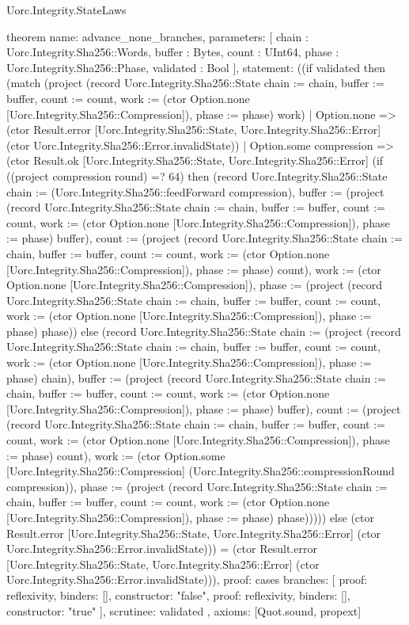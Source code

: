 \begin{lexlean}{Uorc.Integrity.StateLaws}
\begin{semanticmodule}
theorem{
  name: advance_none_branches,
  parameters: [
    chain : Uorc.Integrity.Sha256::Words,
    buffer : Bytes,
    count : UInt64,
    phase : Uorc.Integrity.Sha256::Phase,
    validated : Bool
  ],
  statement: ((if validated then (match (project (record Uorc.Integrity.Sha256::State {chain := chain, buffer := buffer, count := count, work := (ctor Option.none [Uorc.Integrity.Sha256::Compression]), phase := phase}) work)
    | Option.none => (ctor Result.error [Uorc.Integrity.Sha256::State, Uorc.Integrity.Sha256::Error] (ctor Uorc.Integrity.Sha256::Error.invalidState))
    | Option.some compression => (ctor Result.ok [Uorc.Integrity.Sha256::State, Uorc.Integrity.Sha256::Error] (if ((project compression round) =? 64) then (record Uorc.Integrity.Sha256::State {chain := (Uorc.Integrity.Sha256::feedForward compression), buffer := (project (record Uorc.Integrity.Sha256::State {chain := chain, buffer := buffer, count := count, work := (ctor Option.none [Uorc.Integrity.Sha256::Compression]), phase := phase}) buffer), count := (project (record Uorc.Integrity.Sha256::State {chain := chain, buffer := buffer, count := count, work := (ctor Option.none [Uorc.Integrity.Sha256::Compression]), phase := phase}) count), work := (ctor Option.none [Uorc.Integrity.Sha256::Compression]), phase := (project (record Uorc.Integrity.Sha256::State {chain := chain, buffer := buffer, count := count, work := (ctor Option.none [Uorc.Integrity.Sha256::Compression]), phase := phase}) phase)}) else (record Uorc.Integrity.Sha256::State {chain := (project (record Uorc.Integrity.Sha256::State {chain := chain, buffer := buffer, count := count, work := (ctor Option.none [Uorc.Integrity.Sha256::Compression]), phase := phase}) chain), buffer := (project (record Uorc.Integrity.Sha256::State {chain := chain, buffer := buffer, count := count, work := (ctor Option.none [Uorc.Integrity.Sha256::Compression]), phase := phase}) buffer), count := (project (record Uorc.Integrity.Sha256::State {chain := chain, buffer := buffer, count := count, work := (ctor Option.none [Uorc.Integrity.Sha256::Compression]), phase := phase}) count), work := (ctor Option.some [Uorc.Integrity.Sha256::Compression] (Uorc.Integrity.Sha256::compressionRound compression)), phase := (project (record Uorc.Integrity.Sha256::State {chain := chain, buffer := buffer, count := count, work := (ctor Option.none [Uorc.Integrity.Sha256::Compression]), phase := phase}) phase)})))) else (ctor Result.error [Uorc.Integrity.Sha256::State, Uorc.Integrity.Sha256::Error] (ctor Uorc.Integrity.Sha256::Error.invalidState))) = (ctor Result.error [Uorc.Integrity.Sha256::State, Uorc.Integrity.Sha256::Error] (ctor Uorc.Integrity.Sha256::Error.invalidState))),
  proof: cases{
    branches: [
      {proof: reflexivity{}, binders: [], constructor: "false"},
      {proof: reflexivity{}, binders: [], constructor: "true"}
    ],
    scrutinee: validated
  },
  axioms: [Quot.sound, propext]
}


\end{semanticmodule}
\end{lexlean}
